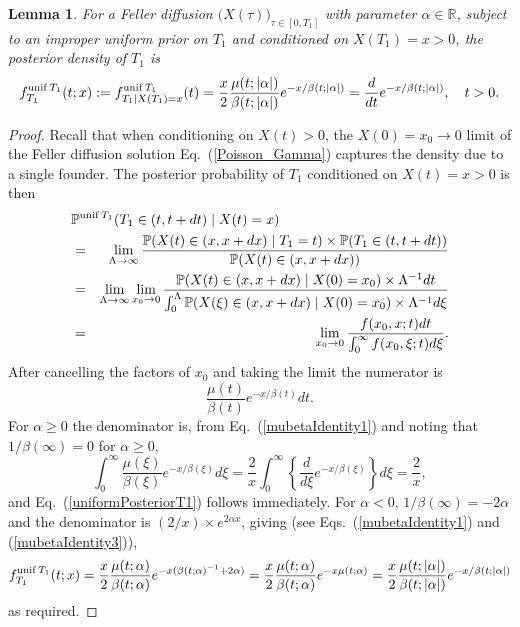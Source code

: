 \documentclass[preprint,12pt]{elsarticle}
\newtheorem{lemma}{Lemma}
\begin{document}
\begin{lemma}	\label{lemma:PosteriorT1}
For a Feller diffusion $\big(X(\tau)\big)_{\tau \in [0, T_1]}$ with parameter $\alpha \in \mathbb{R}$, 
subject to an improper uniform prior on $T_1$ and conditioned on $X(T_1) = x > 0$, the posterior 
density of $T_1$ is 
\begin{equation}		\label{uniformPosteriorT1}
f^{{\rm unif}\,T_1} _{T_1} (t; x) := f^{{\rm unif}\,T_1} _{T_1 \mid X(T_1) = x} (t) = 
	\frac{x}{2} \frac{\mu(t; |\alpha|)}{\beta(t; |\alpha|)} e^{-x/\beta(t; |\alpha|)} = \frac{d}{dt} e^{-x/\beta(t; |\alpha|)}, \quad t > 0.  
\end{equation}
\end{lemma}
%
\begin{proof}
Recall that when conditioning on $X(t) > 0$, the $X(0) = x_0 \to 0$ limit of the Feller diffusion solution Eq.~(\ref{Poisson_Gamma}) 
captures the density due to a single founder.  The posterior probability of $T_1$ conditioned on $X(t) = x > 0$ is then 
\begin{eqnarray*}
\lefteqn{\mathbb{P}^{{\rm unif}\,T_1} (T_1 \in (t, t + dt) \mid X(t) = x) } \\
	& = & \lim_{\Lambda \to \infty} \frac{\mathbb{P}(X(t) \in (x, x + dx) \mid T_1 = t) \times \mathbb{P}(T_1 \in (t, t + dt))}
						{\mathbb{P}(X(t) \in (x, x + dx))} \nonumber \\
	& = & \lim_{\Lambda \to \infty} \lim_{x_0 \to 0}\frac{\mathbb{P}(X(t) \in (x, x + dx) \mid X(0) = x_0) \times \Lambda^{-1} dt}
						{\int_0^\Lambda \mathbb{P}(X(\xi) \in (x, x + dx) \mid X(0) = x_0) \times \Lambda^{-1} d\xi} \nonumber \\
	& = &  \lim_{x_0 \to 0}\frac{f(x_0, x; t)dt}{\int_0^\infty f(x_0, \xi; t) d\xi}.
\end{eqnarray*}
After cancelling the factors of $x_0$ and taking the limit the numerator is 
\[
\frac{\mu(t)}{\beta(t)} e^{-x/\beta(t)} dt . 
\]
For $\alpha \ge 0$ the denominator is, from Eq.~(\ref{mubetaIdentity1}) and noting that $1/\beta(\infty) = 0$ for $\alpha \ge 0$, 
\[
\int_0^\infty \frac{\mu(\xi)}{\beta(\xi)} e^{-x/\beta(\xi)} d\xi = \frac{2}{x} \int_0^\infty \left\{\frac{d}{d\xi} e^{-x/\beta(\xi)}\right\}  d\xi = \frac{2}{x},
\]
and Eq.~(\ref{uniformPosteriorT1}) follows immediately.  
For $\alpha < 0$, $1/\beta(\infty) = -2\alpha$ and the denominator is $(2/x)\times e^{2\alpha x}$, giving (see 
Eqs.~(\ref{mubetaIdentity1}) and (\ref{mubetaIdentity3})), 
\[
f^{{\rm unif}\,T_1} _{T_1} (t; x) = \frac{x}{2} \frac{\mu(t; \alpha)}{\beta(t; \alpha)} e^{-x(\beta(t; \alpha)^{-1} + 2\alpha)} = \frac{x}{2} \frac{\mu(t; \alpha)}{\beta(t; \alpha)} e^{-x\mu(t; \alpha)} = \frac{x}{2} \frac{\mu(t; |\alpha|)}{\beta(t; |\alpha|)} e^{-x/\beta(t; |\alpha|)}
\]
as required.  
\end{proof}
\end{document}
